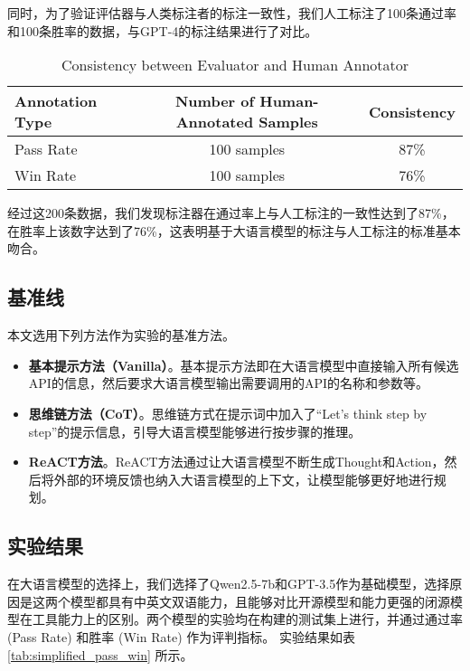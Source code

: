 同时，为了验证评估器与人类标注者的标注一致性，我们人工标注了100条通过率和100条胜率的数据，与GPT-4的标注结果进行了对比。

\begin{table}[h]
  \centering
  \caption{Consistency between Evaluator and Human Annotator}
  \label{tab:consistency}
  \begin{tabular}{l|c|c}
  \toprule
  \textbf{Annotation Type} & \textbf{Number of Human-Annotated Samples} & \textbf{Consistency} \\ \midrule
  Pass Rate                & 100 samples                                & 87\%                 \\
  Win Rate                 & 100 samples                                & 76\%                 \\ 
  \bottomrule
  \end{tabular}
\end{table}
  
  \noindent

经过这200条数据，我们发现标注器在通过率上与人工标注的一致性达到了87\%，在胜率上该数字达到了76\%，这表明基于大语言模型的标注与人工标注的标准基本吻合。

\subsection{基准线}

本文选用下列方法作为实验的基准方法。

\begin{itemize}
  \item  \textbf{基本提示方法（Vanilla）}。基本提示方法即在大语言模型中直接输入所有候选API的信息，然后要求大语言模型输出需要调用的API的名称和参数等。
  \item  \textbf{思维链方法（CoT）}\cite{Wang2023a}。思维链方式在提示词中加入了“Let's think step by step”的提示信息，引导大语言模型能够进行按步骤的推理。
  \item  \textbf{ReACT方法}\cite{Yao2023b}。ReACT方法通过让大语言模型不断生成Thought和Action，然后将外部的环境反馈也纳入大语言模型的上下文，让模型能够更好地进行规划。
\end{itemize}
\indent

\subsection{实验结果}

在大语言模型的选择上，我们选择了Qwen2.5-7b和GPT-3.5作为基础模型，选择原因是这两个模型都具有中英文双语能力，且能够对比开源模型和能力更强的闭源模型在工具能力上的区别。两个模型的实验均在构建的测试集上进行，并通过通过率 (Pass Rate) 和胜率 (Win Rate) 作为评判指标。
实验结果如表 \ref{tab:simplified_pass_win} 所示。

